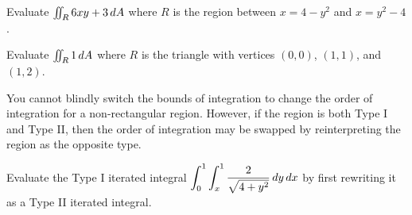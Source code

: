 \documentclass[letterpaper, twoside, 12pt]{book}
\begin{document}
          \begin{contributors}

          \end{contributors}

          \begin{problem}
            Evaluate $\iint_R 6xy+3 \,d{A}$
            where $R$ is the region between $x=4-y^2$ and $x=y^2-4$.
          \end{problem}

          \begin{solution}

          \end{solution}

          \begin{contributors}

          \end{contributors}

          \begin{problem}
            Evaluate $\iint_R 1 \,d{A}$
            where $R$ is the triangle with vertices $(0,0)$,
            $(1,1)$, and $(1,2)$.
          \end{problem}

          \begin{solution}

          \end{solution}

          \begin{contributors}

          \end{contributors}

\begin{remark}
  You cannot blindly switch the bounds of integration to change
  the order of integration for a non-rectangular
  region. However, if the region is both Type I and Type II, then the
  order of integration may be swapped by reinterpreting the region
  as the opposite type.
\end{remark}

          \begin{problem}
            Evaluate the Type I iterated integral
            $\displaystyle\int_0^1\int_x^1 \frac{2}{\sqrt{4+y^2}}\,d{y}\,d{x}$
            by first rewriting it as a Type II iterated integral.
          \end{problem}

          \begin{solution}

          \end{solution}
\end{document}
